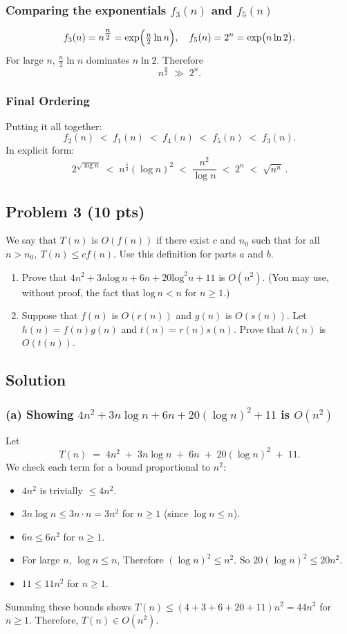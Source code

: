 \documentclass[12pt]{article}
\begin{document}
\subsubsection*{Comparing the exponentials $f_3(n)$ and $f_5(n)$}
\[
f_3(n) = n^{\tfrac{n}{2}} 
= \exp\Bigl(\tfrac{n}{2}\ln n\Bigr),
\quad
f_5(n) = 2^n 
= \exp\bigl(n\ln 2\bigr).
\]
For large \(n\), \(\tfrac{n}{2}\ln n\) dominates \(n\ln 2\). Therefore 
\[
n^{\tfrac{n}{2}} \;\gg\; 2^n.
\]

\subsubsection*{Final Ordering}
Putting it all together:
\[
f_2(n) \;<\; f_1(n) \;<\; f_4(n) \;<\; f_5(n) \;<\; f_3(n).
\]
In explicit form:
\[
\boxed{
2^{\sqrt{\log n}} \;<\;
n^{\tfrac{5}{3}} (\log n)^2 \;<\;
\frac{n^2}{\log n} \;<\;
2^n \;<\;
\sqrt{n^n}\,.
}
\]

\subsection*{Problem 3 (10 pts)}
We say that $T(n)$ is $O(f(n))$ if there exist $c$ and $n_0$ such that for all $n > n_0,\:T(n) \le cf(n)$. Use this definition for parts $a$ and $b$.
\begin{enumerate}
    \item Prove that $4n^2 + 3n\text{log}\:n + 6n + 20\text{log}^2n + 11$ is $O(n^2)$. (You may use, without proof, the fact that $\text{log}\:n < n$ for $n \ge 1$.)
    \item Suppose that $f(n)$ is $O(r(n))$ and $g(n)$ is $O(s(n))$. Let $h(n) = f(n)g(n)$ and $t(n) = r(n)s(n)$. Prove that $h(n)$ is $O(t(n))$.
\end{enumerate}

\subsection*{Solution}

\subsubsection*{(a) Showing $4n^2 + 3n\log n + 6n + 20(\log n)^2 + 11$ is $O(n^2)$}

Let
\[
T(n) \;=\; 4n^2 \;+\; 3n\log n \;+\; 6n \;+\; 20(\log n)^2 \;+\; 11.
\]
We check each term for a bound proportional to \(n^2\):
\begin{itemize}
    \item \(4n^2\) is trivially \(\le 4n^2\).
    \item \(3n\log n \le 3n\cdot n = 3n^2\) for \(n\ge1\) (since \(\log n \le n\)).
    \item \(6n \le 6n^2\) for \(n\ge1\).
    \item For large \(n\), \(\log n \le n\), Therefore \((\log n)^2 \le n^2\). So \(20(\log n)^2 \le 20n^2\).
    \item \(11\le 11n^2\) for \(n\ge1\).
\end{itemize}
Summing these bounds shows \(T(n)\le (4+3+6+20+11)n^2 = 44n^2\) for \(n\ge1\). Therefore, \(T(n)\in O(n^2)\).
\end{document}
